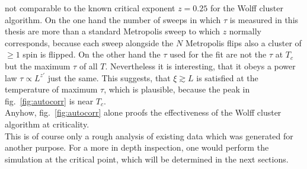     not comparable to the known critical exponent \(z=0.25\) \cite{NewmanBarkema1999}
    for the Wolff cluster algorithm. On the one hand the number of sweeps
    in which \(\tau\) is measured in this thesis are more than a standard
    Metropolis sweep to which \(z\) normally corresponds, because each sweep
    alongside the \(N\) Metropolis flips also a cluster of \(\ge 1\) spin is
    flipped. On the other hand the \(\tau\) used for the fit are not the
    \(\tau\) at \(T_{c}\) but the maximum \(\tau\) of all \(T\).
    Nevertheless it is interesting, that it obeys a power law
    \(\tau \propto L^{z'}\) just the same. This suggests, that \(\xi \gtrsim L\)
    is satisfied at the temperature of maximum \(\tau\), which is plausible,
    because the peak in fig.\ \ref{fig:autocorr}
    is near \(T_{c}\).\\
    Anyhow, fig.\ \ref{fig:autocorr} alone
    proofs the effectiveness of the Wolff cluster algorithm at criticality.\\
    This is of course only a rough analysis of existing data which was
    generated for another purpose. For a more in depth inspection, one
    would perform the simulation at the critical point, which will be
    determined in the next sections.

